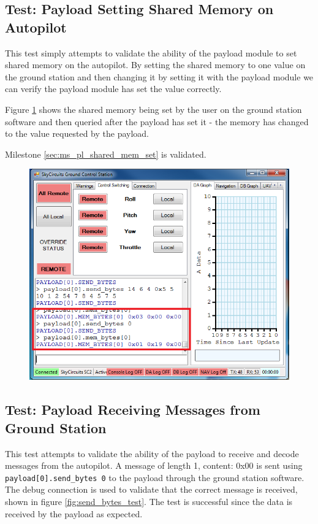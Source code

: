 \subsection{Test: Payload Setting Shared Memory on Autopilot}
\label{sec:test_pl_set_shared_mem}
This test simply attempts to validate the ability of the payload module to set shared memory on 
the autopilot. By setting the shared memory to one value on the ground station and then changing
it by setting it with the payload module we can verify the payload module has set the value correctly.

Figure \ref{fig:mem_bytes_test} shows the shared memory being set by the user
on the ground station software and then queried after the payload has set it - the memory
has changed to the value requested by the payload.

Milestone \ref{sec:ms_pl_shared_mem_set} is validated.

\begin{figure}[H]
        \centering
        \includegraphics[width=1.0\textwidth]{testing_screenshots/mem_bytes_test.png}
        \label{fig:mem_bytes_test}
\end{figure}

\subsection{Test:  Payload Receiving Messages from Ground Station}
\label{sec:test_pl_receive_message}
This test attempts to validate the ability of the payload to receive and decode messages from the
autopilot. A message of length 1, content: 0x00 is sent using \verb+payload[0].send_bytes 0+ to
the payload through the ground station software. The debug connection is used to validate that the
correct message is received, shown in figure \ref{fig:send_bytes_test}. The test is successful
since the data is received by the payload as expected.


